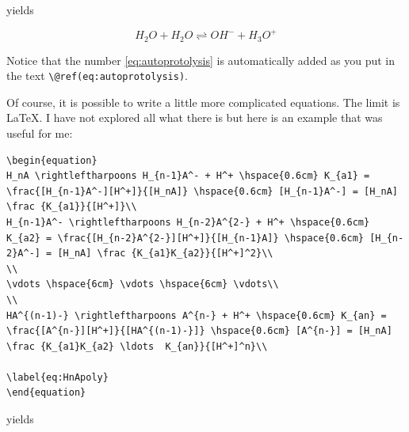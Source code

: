 \documentclass[]{book}
\theoremstyle{definition}
\theoremstyle{definition}
\theoremstyle{definition}
\theoremstyle{remark}
\begin{document}
yields

\begin{equation}
H_2O + H_2O \rightleftharpoons OH^- + H_3O^+
\label{eq:autoprotolysis}
\end{equation}

Notice that the number \eqref{eq:autoprotolysis} is automatically added as
you put in the text \texttt{\textbackslash{}@ref(eq:autoprotolysis)}.

Of course, it is possible to write a little more complicated equations.
The limit is LaTeX. I have not explored all what there is but here is an
example that was useful for me:

\begin{verbatim}
\begin{equation}
H_nA \rightleftharpoons H_{n-1}A^- + H^+ \hspace{0.6cm} K_{a1} = \frac{[H_{n-1}A^-][H^+]}{[H_nA]} \hspace{0.6cm} [H_{n-1}A^-] = [H_nA] \frac {K_{a1}}{[H^+]}\\
H_{n-1}A^- \rightleftharpoons H_{n-2}A^{2-} + H^+ \hspace{0.6cm} K_{a2} = \frac{[H_{n-2}A^{2-}][H^+]}{[H_{n-1}A]} \hspace{0.6cm} [H_{n-2}A^-] = [H_nA] \frac {K_{a1}K_{a2}}{[H^+]^2}\\
\\
\vdots \hspace{6cm} \vdots \hspace{6cm} \vdots\\
\\
HA^{(n-1)-} \rightleftharpoons A^{n-} + H^+ \hspace{0.6cm} K_{an} = \frac{[A^{n-}][H^+]}{[HA^{(n-1)-}]} \hspace{0.6cm} [A^{n-}] = [H_nA] \frac {K_{a1}K_{a2} \ldots  K_{an}}{[H^+]^n}\\

\label{eq:HnApoly}
\end{equation}
\end{verbatim}

yields
\end{document}
